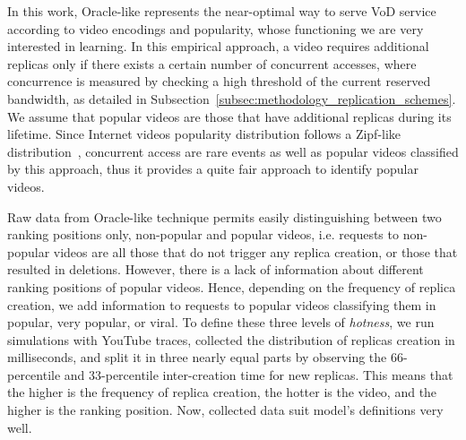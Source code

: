 In this work, Oracle-like represents the near-optimal way to serve VoD service according to video encodings and popularity, whose functioning we are very interested in learning. In this empirical approach, a video requires additional replicas only if there exists a certain number of concurrent accesses, where concurrence is measured by checking a high threshold of the current reserved bandwidth, as detailed in Subsection~\ref{subsec:methodology_replication_schemes}. We assume that popular videos are those that have additional replicas during its lifetime. Since Internet videos popularity distribution follows a Zipf-like distribution~\cite{popularity_prediction_2010}, concurrent access are rare events as well as popular videos classified by this approach, thus it provides a quite fair approach to identify popular videos. 

Raw data from Oracle-like technique permits easily distinguishing between two ranking positions only, non-popular and popular videos, i.e. requests to non-popular videos are all those that do not trigger any replica creation, or those that resulted in deletions. However, there is a lack of information about different ranking positions of popular videos. Hence, depending on the frequency of replica creation, we add information to requests to popular videos classifying them in popular, very popular, or viral. To define these three levels of \emph{hotness}, we run simulations with YouTube traces, collected the distribution of replicas creation in milliseconds, and split it in three nearly equal parts by observing the 66-percentile and 33-percentile inter-creation time for new replicas. This means that the higher is the frequency of replica creation, the hotter is the video, and the higher is the ranking position. Now, collected data suit model's definitions very well. 
